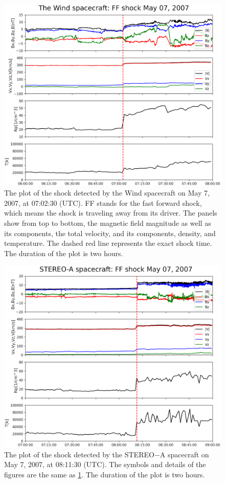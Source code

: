 \documentclass[draft]{agujournal2019}
\begin{document}
\begin{figure}[!t]
\centering
\includegraphics[width=1.\textwidth]{jgr-2023-ipshocks-f01.eps}
\caption{The plot of the shock detected by the Wind spacecraft on May 7, 2007, at 07:02:30 (UTC). FF stands for the fast forward shock, which means the shock is traveling away from its driver. The panels show from top to bottom, the magnetic field magnitude as well as its components, the total velocity, and its components, density, and temperature. The dashed red line represents the exact shock time. The duration of the plot is two hours.}
\label{fig:WindIP0507}
\end{figure}

\pagebreak

\begin{figure}[!t]
\centering
\includegraphics[width=1.\textwidth]{jgr-2023-ipshocks-f02.eps}
\caption{The plot of the shock detected by the STEREO$-$A spacecraft on May 7, 2007, at 08:11:30 (UTC). The symbols and details of the figures are the same as \ref{fig:WindIP0507}. The duration of the plot is two hours.}
\label{fig:staIP0507}
\end{figure}
\end{document}
